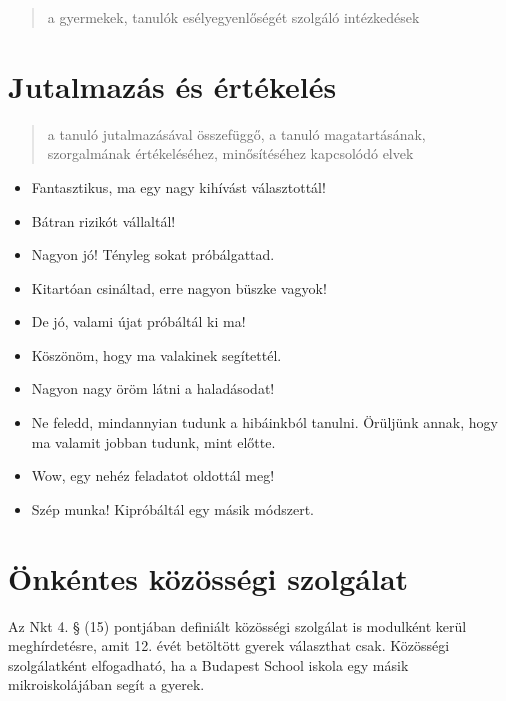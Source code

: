 \begin{quote}
a gyermekek, tanulók esélyegyenlőségét szolgáló intézkedések
\end{quote}

\section{Jutalmazás és
értékelés}\label{jutalmazuxe1s-uxe9s-uxe9rtuxe9keluxe9s}

\begin{quote}
a tanuló jutalmazásával összefüggő, a tanuló magatartásának,
szorgalmának értékeléséhez, minősítéséhez kapcsolódó elvek
\end{quote}


\begin{itemize}

\item
  Fantasztikus, ma egy nagy kihívást választottál!
\item
  Bátran rizikót vállaltál!
\item
  Nagyon jó! Tényleg sokat próbálgattad.
\item
  Kitartóan csináltad, erre nagyon büszke vagyok!
\item
  De jó, valami újat próbáltál ki ma!
\item
  Köszönöm, hogy ma valakinek segítettél.
\item
  Nagyon nagy öröm látni a haladásodat!
\item
  Ne feledd, mindannyian tudunk a hibáinkból tanulni. Örüljünk annak,
  hogy ma valamit jobban tudunk, mint előtte.
\item
  Wow, egy nehéz feladatot oldottál meg!
\item
  Szép munka! Kipróbáltál egy másik módszert.
\end{itemize}

\section{Önkéntes közösségi
szolgálat}\label{uxf6nkuxe9ntes-kuxf6zuxf6ssuxe9gi-szolguxe1lat}

Az Nkt 4. § (15) pontjában definiált közösségi szolgálat is modulként
kerül meghírdetésre, amit 12. évét betöltött gyerek választhat csak.
Közösségi szolgálatként elfogadható, ha a Budapest School iskola egy
másik mikroiskolájában segít a gyerek.
